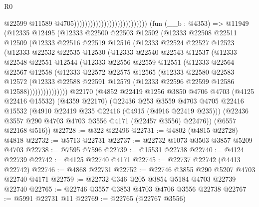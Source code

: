 \begin{lexlean}{R0}
\begin{coremodule}
                                                          @22599
                                                          @11589
                                                          @4705)))))))))))))))))))))))))))
    (fun (__b : @4353) =>
    @11949
      (@12335
        @12495
        (@12333
          @22500
          @22503
          @12502
          (@12333
            @22508
            @22511
            @12509
            (@12333
              @22516
              @22519
              @12516
              (@12333
                @22524
                @22527
                @12523
                (@12333
                  @22532
                  @22535
                  @12530
                  (@12333
                    @22540
                    @22543
                    @12537
                    (@12333
                      @22548
                      @22551
                      @12544
                      (@12333
                        @22556
                        @22559
                        @12551
                        (@12333
                          @22564
                          @22567
                          @12558
                          (@12333
                            @22572
                            @22575
                            @12565
                            (@12333
                              @22580
                              @22583
                              @12572
                              (@12333
                                @22588
                                @22591
                                @12579
                                (@12333 @22596 @22599 @12586 @12588)))))))))))))))
    @22170
    (@4852
      @22419
      @1256
      @3850
      @4706
      @4703
      (@4125 @22416 @15532)
      (@4359 @22170)
      (@22436
        @253
        @3559
        @4703
        @4705
        @22416
        @15532
        (@4910 @22419 @235 @22416 (@4915 (@4916 @22419 @235)))
        (@22436 @3557 @290 @4703 @4703 @3556 @4171 (@22457 @3556) @22476))
      (@6557 @22168 @516))
@22728 := @322 @22496
@22731 := @4802 (@4815 @22728) @4818
@22732 := @5713 @22731
@22737 := @22732 @1073 @3503 @3857 @5209 @4703
@22738 := @7595 @7596
@22739 := @15531 @22738
@22740 := @4124 @22739
@22742 := @4125 @22740 @4171
@22745 := @22737 @22742 (@4413 @22742)
@22746 := @4868 @22731
@22752 := @22746 @3855 @290 @5207 @4703 @22740 @4171
@22759 := @22732 @346 @205 @3854 @5184 @4703 @22739 @22740
@22765 := @22746 @3557 @3853 @4703 @4706 @3556 @22738
@22767 := @5991 @22731 @11
@22769 := @22765 (@22767 @3556)

\end{coremodule}
\end{lexlean}
